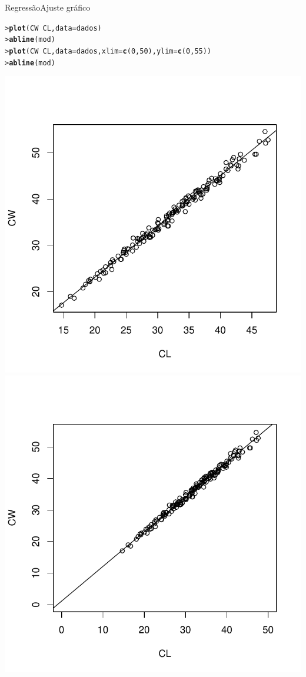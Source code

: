 \documentclass[10pt]{beamer}\usepackage[]{graphicx}\usepackage[]{color}
\makeatletter
\newcommand{\hlnum}[1]{\textcolor[rgb]{0.686,0.059,0.569}{#1}}%
\newcommand{\hlopt}[1]{\textcolor[rgb]{0,0,0}{#1}}%
\newcommand{\hlstd}[1]{\textcolor[rgb]{0.345,0.345,0.345}{#1}}%
\newcommand{\hlkwc}[1]{\textcolor[rgb]{0.333,0.667,0.333}{#1}}%
\newcommand{\hlkwd}[1]{\textcolor[rgb]{0.282,0.239,0.545}{\textbf{#1}}}%
\newenvironment{kframe}{%
 \def\at@end@of@kframe{}%
 \ifinner\ifhmode%
  \def\at@end@of@kframe{\end{minipage}}%
  \begin{minipage}{\columnwidth}%
 \fi\fi%
 \def\FrameCommand##1{\hskip\@totalleftmargin \hskip-\fboxsep
 \colorbox{shadecolor}{##1}\hskip-\fboxsep
     \hskip-\linewidth \hskip-\@totalleftmargin \hskip\columnwidth}%
 \MakeFramed {\advance\hsize-\width
   \@totalleftmargin\z@ \linewidth\hsize
   \@setminipage}}%
 {\par\unskip\endMakeFramed%
 \at@end@of@kframe}
\newenvironment{knitrout}{}{} %
\makeatother
\begin{document}
\begin{frame}[fragile=singleslide]{Regressão}{Ajuste gráfico}
\begin{knitrout}\small
{}\color{fgcolor}\begin{kframe}
\begin{alltt}
\hlstd{> }\hlkwd{plot}\hlstd{(CW} \hlopt{~} \hlstd{CL,} \hlkwc{data} \hlstd{= dados)}
\hlstd{> }\hlkwd{abline}\hlstd{(mod)}
\hlstd{> }\hlkwd{plot}\hlstd{(CW} \hlopt{~} \hlstd{CL,} \hlkwc{data} \hlstd{= dados,} \hlkwc{xlim} \hlstd{=} \hlkwd{c}\hlstd{(}\hlnum{0}\hlstd{,}\hlnum{50}\hlstd{),} \hlkwc{ylim} \hlstd{=} \hlkwd{c}\hlstd{(}\hlnum{0}\hlstd{,}\hlnum{55}\hlstd{))}
\hlstd{> }\hlkwd{abline}\hlstd{(mod)}
\end{alltt}
\end{kframe}

{\centering \includegraphics[width=.49\textwidth]{figure/unnamed-chunk-171} 
\includegraphics[width=.49\textwidth]{figure/unnamed-chunk-172} 

}



\end{knitrout}

\end{frame}
\end{document}
